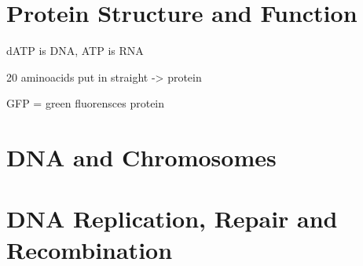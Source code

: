 \chapter{Protein Structure and Function}

dATP is DNA, ATP is RNA

20 aminoacids put in straight -> protein

GFP = green fluorensces protein


\chapter{DNA and Chromosomes}


\chapter{DNA Replication, Repair and Recombination}